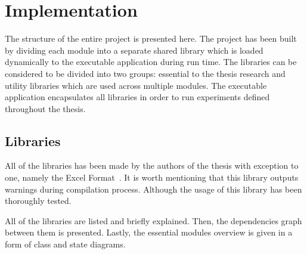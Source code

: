 \documentclass{mini}
\begin{document}
\chapter{Implementation} \label{chap:domain}
The structure of the entire project is presented here.
The project has been built by dividing each module into a separate shared library which is loaded dynamically to the executable application during run time. The libraries can be considered to be divided into two groups: essential to the thesis research and utility libraries which are used across multiple modules. The executable application encapsulates all libraries in order to run experiments defined throughout the thesis.

\section{Libraries}

All of the libraries has been made by the authors of the thesis with exception to one, namely the Excel Format~\cite{excel_format}. It is worth mentioning that this library outputs warnings during compilation process. Although the usage of this library has been thoroughly tested.

All of the libraries are listed and briefly explained. Then, the dependencies graph between them is presented. Lastly, the essential modules overview is given in a form of class and state diagrams.
\end{document}

